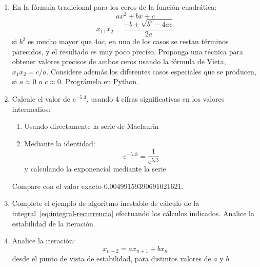   \begin{enumerate}
  \item
    En la fórmula tradicional para los ceros de la función cuadrática:
    \begin{equation*}
      a x^2 + b x + c
    \end{equation*}
    \begin{equation*}
      x_1, x_2
        = \frac{-b \pm \sqrt{b^2 - 4 a c}}{2 a}
    \end{equation*}
    si \(b^2\) es mucho mayor que \(4 a c\),
    en uno de los casos se restan términos parecidos,
    y el resultado es muy poco preciso.
    Proponga una técnica para obtener valores precisos de ambos ceros
    usando la fórmula de Vieta,
    \(x_1 x_2 = c / a\).
    Considere además los diferentes casos especiales que se producen,
    si \(a \approx 0\) o \(c \approx 0\).
    Prográmela en Python.
  \item
    Calcule el valor de \(\mathrm{e}^{-5.3}\),
    usando \num{4} cifras significativas en los valores intermedios:
    \begin{enumerate}
    \item
      Usando directamente la serie de Maclaurin
    \item
      Mediante la identidad:
      \begin{equation*}
        \mathrm{e}^{-5,3}
          = \frac{1}{\mathrm{e}^{5,3}}
      \end{equation*}
      y calculando la exponencial mediante la serie
    \end{enumerate}
    Compare con el valor exacto \num{0,00499159390691021621}.
  \item
    Complete el ejemplo de algoritmo inestable
    de cálculo de la integral~\eqref{eq:integral-recurrencia}
    efectuando los cálculos indicados.
    Analice la estabilidad de la iteración.
  \item
    Analice la iteración:
    \begin{equation*}
      x_{n + 2}
        = a x_{n + 1} + b x_n
    \end{equation*}
    desde el punto de vista de estabilidad,
    para distintos valores de \(a\) y \(b\).
  \end{enumerate}




